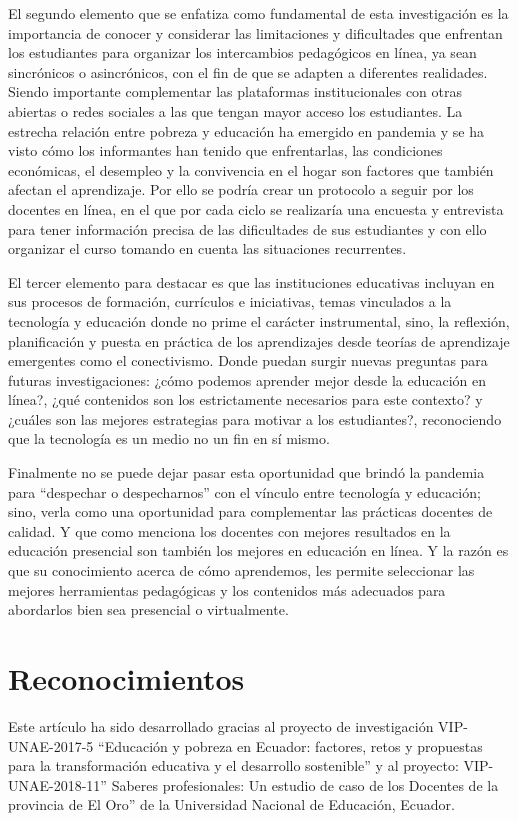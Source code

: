 \documentclass[spanish]{textolivre}
\begin{document}
El segundo elemento que se enfatiza como fundamental de esta investigación es la importancia de conocer y considerar las limitaciones y dificultades que enfrentan los estudiantes para organizar los intercambios pedagógicos en línea, ya sean sincrónicos o asincrónicos, con el fin de que se adapten a diferentes realidades. Siendo importante complementar las plataformas institucionales con otras abiertas o redes sociales a las que tengan mayor acceso los estudiantes. La estrecha relación entre pobreza y educación ha emergido en pandemia y se ha visto cómo los informantes han tenido que enfrentarlas, las condiciones económicas, el desempleo y la convivencia en el hogar son factores que también afectan el aprendizaje. Por ello se podría crear un protocolo a seguir por los docentes en línea, en el que por cada ciclo se realizaría una encuesta y entrevista para tener información precisa de las dificultades de sus estudiantes y con ello organizar el curso tomando en cuenta las situaciones recurrentes.

El tercer elemento para destacar es que las instituciones educativas incluyan en sus procesos de formación, currículos e iniciativas, temas vinculados a la tecnología y educación donde no prime el carácter instrumental, sino, la reflexión, planificación y puesta en práctica de los aprendizajes desde teorías de aprendizaje emergentes como el conectivismo. Donde puedan surgir nuevas preguntas para futuras investigaciones: ¿cómo podemos aprender mejor desde la educación en línea?, ¿qué contenidos son los estrictamente necesarios para este contexto? y ¿cuáles son las mejores estrategias para motivar a los estudiantes?, reconociendo que la tecnología es un medio no un fin en sí mismo.

Finalmente no se puede dejar pasar esta oportunidad que brindó la pandemia para “despechar o despecharnos” con el vínculo entre tecnología y educación; sino, verla como una oportunidad para complementar las prácticas docentes de calidad. Y que como menciona \textcite{christodoulou_teachers_2020} los docentes con mejores resultados en la educación presencial son también los mejores en educación en línea. Y la razón es que su conocimiento acerca de cómo aprendemos, les permite seleccionar las mejores herramientas pedagógicas y los contenidos más adecuados para abordarlos bien sea presencial o virtualmente.

\section{Reconocimientos}\label{sec-organizacao-latex}
Este artículo ha sido desarrollado gracias al proyecto de investigación VIP-UNAE-2017-5 “Educación y pobreza en Ecuador: factores, retos y propuestas para la transformación educativa y el desarrollo sostenible” y al proyecto: VIP-UNAE-2018-11” Saberes profesionales: Un estudio de caso de los Docentes de la provincia de El Oro” de la Universidad Nacional de Educación, Ecuador.

\printbibliography\label{sec-bib}
\end{document}
